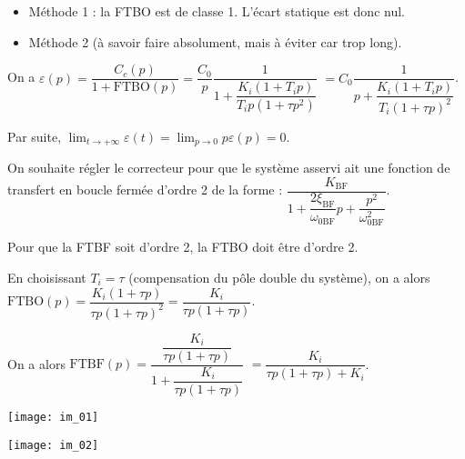 \ifprof
\begin{corrige}
\begin{itemize}
\item Méthode 1 : la FTBO est de classe 1. L'écart statique est donc nul. 
\end{itemize}

\begin{itemize}
\item Méthode 2 (à savoir faire absolument, mais à éviter car trop long).
\end{itemize}

On a $\varepsilon(p) = \dfrac{C_c(p)}{1+\text{FTBO}(p)}=\dfrac{C_0}{p}\dfrac{1}{1+\dfrac{K_i (1+T_i p)}{T_i p (1+\tau p ^2)}}$
$=C_0\dfrac{1}{p+\dfrac{K_i (1+T_i p)}{T_i (1+\tau p )^2}}$.

Par suite, $\lim_{t\to + \infty} \varepsilon(t)=\lim_{p\to 0} p \varepsilon(p)=0$.

\end{corrige}
\else
\fi

\vspace{.25cm}

On souhaite régler le correcteur pour que le système asservi ait une fonction de transfert en boucle fermée
d’ordre 2 de la forme :
$\dfrac{K_{\text{BF}}}{1+\dfrac{2\xi_{\text{BF}}}{\omega_{0\text{BF}}}p+\dfrac{p^2}{\omega_{0\text{BF}}^2}}$.


\ifprof
\begin{corrige}
Pour que la FTBF soit d'ordre 2, la FTBO doit être d'ordre 2. 

En choisissant $T_i = \tau$ (compensation du pôle double du système), on a alors 
$\text{FTBO}(p)=\dfrac{K_i (1+\tau p)}{\tau p (1+\tau p)^2}=\dfrac{K_i }{\tau p (1+\tau p)}$.

On a alors 
$\text{FTBF}(p) = \dfrac{\dfrac{K_i }{\tau p (1+\tau p)}}{1+\dfrac{K_i }{\tau p (1+\tau p)}}$
$= \dfrac{K_i}{\tau p (1+\tau p)+K_i }$.

\end{corrige}
\else
\fi



\begin{marginfigure}
\texttt{[image: im\_01]}
\end{marginfigure}

\begin{marginfigure}
\texttt{[image: im\_02]}
\end{marginfigure}

